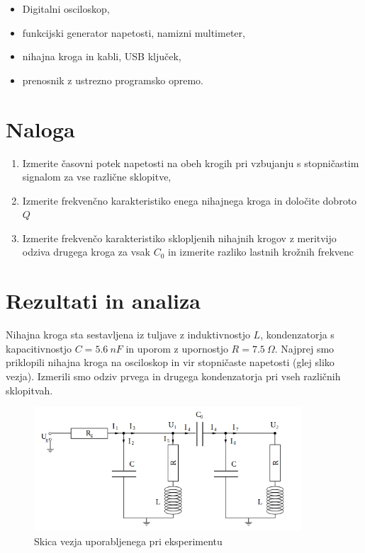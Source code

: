 \documentclass[12pt]{article}
\begin{document}
\begin{itemize}
\item Digitalni osciloskop,
\item funkcijski generator napetosti, namizni multimeter,
\item nihajna kroga in kabli, USB ključek,
\item prenosnik z ustrezno programsko opremo.
\end{itemize}


\section{Naloga}

\begin{enumerate}
\item Izmerite časovni potek napetosti na obeh krogih pri vzbujanju s stopničastim signalom za vse različne sklopitve,
\item Izmerite frekvenčno karakteristiko enega nihajnega kroga in določite dobroto $Q$
\item Izmerite frekvenčo karakteristiko sklopljenih nihajnih krogov z meritvijo odziva drugega kroga za vsak $C_0$ in izmerite razliko lastnih krožnih frekvenc
\end{enumerate}


\section{Rezultati in analiza}

Nihajna kroga sta sestavljena iz tuljave z induktivnostjo $L$, kondenzatorja s kapacitivnostjo $C = 5.6\ nF$ in uporom z upornostjo $R = 7.5\ \Omega$. Najprej smo priklopili nihajna kroga na osciloskop in vir stopničaste napetosti (glej sliko vezja). Izmerili smo odziv prvega in drugega kondenzatorja pri vseh različnih sklopitvah.

\begin{figure}[ht]
\begin{center}
    \includegraphics[width=10cm]{vezje.png}
    \caption{Skica vezja uporabljenega pri eksperimentu}
\end{center}
\end{figure}
\end{document}
